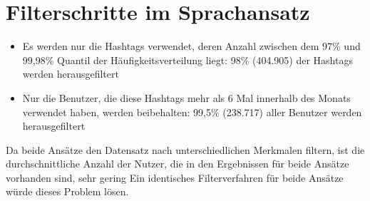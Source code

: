 \section{Filterschritte im Sprachansatz}
\begin{itemize}
	\item Es werden nur die Hashtags verwendet, deren Anzahl zwischen dem 97\% und 99,98\% Quantil der Häufigkeitsverteilung liegt: 98\% (404.905) der Hashtags werden herausgefiltert
	\item Nur die Benutzer, die diese Hashtags mehr als 6 Mal innerhalb des Monats verwendet haben, werden beibehalten: 99,5\% (238.717) aller Benutzer werden herausgefiltert
\end{itemize}
Da beide Ansätze den Datensatz nach unterschiedlichen Merkmalen filtern, ist die durchschnittliche Anzahl der Nutzer, die in den Ergebnissen für beide Ansätze vorhanden sind, sehr gering  Ein identisches Filterverfahren für beide Ansätze würde dieses Problem lösen.